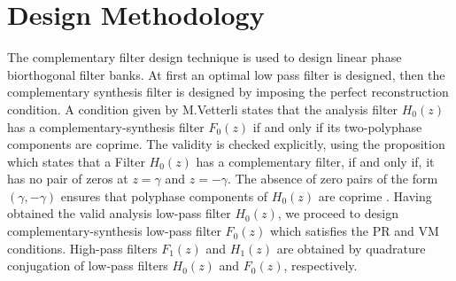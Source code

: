\section{\label{sub:design-methodology}Design Methodology}
The complementary filter design technique is used to design linear phase biorthogonal filter banks. At first an optimal low pass filter is designed, then the complementary synthesis filter is designed by imposing the perfect reconstruction condition. A condition given by M.Vetterli \cite{key-12} states that the analysis filter $H_{0}(z)$ has a complementary-synthesis filter $F_{0}(z)$ if and only if its two-polyphase components are coprime. The validity is checked explicitly, using the proposition \cite{key-12} which states that a Filter $H_{0}(z)$ has a complementary filter, if and
only if, it has no pair of zeros at $z=\gamma$ and $z=-\gamma$. The absence of zero pairs of the form $(\gamma,-\gamma)$ ensures
that polyphase components of $H_{0}(z)$ are coprime \cite{key-12}. Having obtained the valid analysis low-pass filter $H_{0}(z)$, we
proceed to design complementary-synthesis low-pass filter $F_{0}(z)$ which satisfies the PR and VM conditions. High-pass filters $F_{1}(z)$ and $H_{1}(z)$ are obtained by quadrature conjugation of low-pass filters $H_{0}(z)$ and $F_{0}(z)$, respectively. 	
